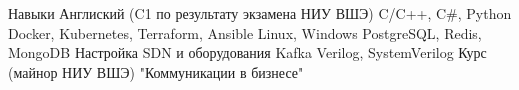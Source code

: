 
\begin{rubric}{Навыки}
	Англиский (C1 по результату экзамена НИУ ВШЭ)
	C/C++, C\#, Python
	Docker, Kubernetes, Terraform, Ansible
	Linux, Windows
	PostgreSQL, Redis, MongoDB
	Настройка SDN и оборудования
	Kafka
 \entry*[HDL]
 	Verilog, SystemVerilog
 \entry*[Менеджмент]
	Курс (майнор НИУ ВШЭ) "Коммуникации в бизнесе"
\end{rubric}

